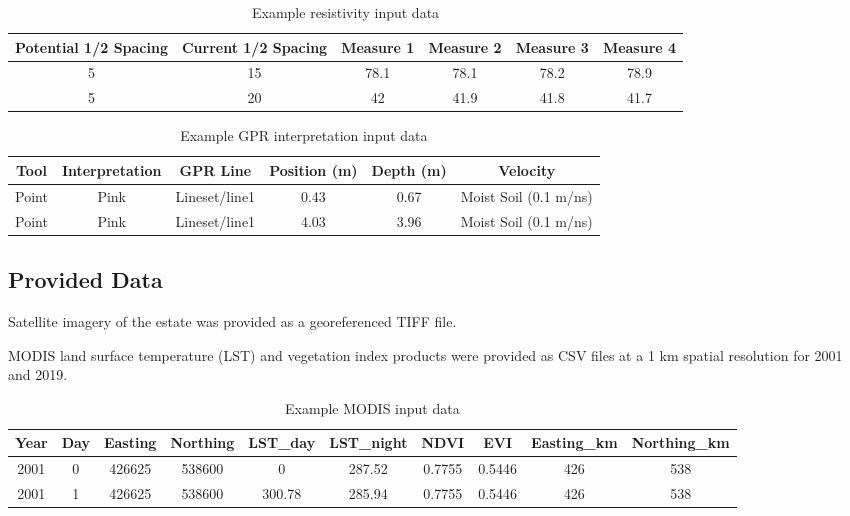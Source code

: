 \documentclass{article}
\begin{document}
\begin{table}[H]
	\centering
	\begin{tabular}{cccccc}
		\hline
		Potential 1/2 Spacing & Current 1/2 Spacing & Measure 1 & Measure 2 & Measure 3 & Measure 4 \\
		\hline
		5                     & 15                  & 78.1      & 78.1      & 78.2      & 78.9      \\
		5                     & 20                  & 42        & 41.9      & 41.8      & 41.7      \\
		\hline
	\end{tabular}
	\caption{Example resistivity input data}
\end{table}

\begin{table}[H]
	\centering
	\begin{tabular}{cccccc}
		\hline
		Tool  & Interpretation & GPR Line      & Position (m) & Depth (m) & Velocity              \\
		\hline
		Point & Pink           & Lineset/line1 & 0.43         & 0.67      & Moist Soil (0.1 m/ns) \\
		Point & Pink           & Lineset/line1 & 4.03         & 3.96      & Moist Soil (0.1 m/ns) \\
		\hline
	\end{tabular}
	\caption{Example GPR interpretation input data}
\end{table}

\subsection{Provided Data}

Satellite imagery of the estate was provided as a georeferenced TIFF file.

MODIS land surface temperature (LST) and vegetation index products were provided as CSV files at a 1 km spatial resolution for 2001 and 2019.

\begin{table}[H]
	\centering
	\begin{tabular}{cccccccccc}
		\hline
		Year & Day & Easting & Northing & LST\_day & LST\_night & NDVI   & EVI    & Easting\_km & Northing\_km \\
		\hline
		2001 & 0   & 426625  & 538600   & 0        & 287.52     & 0.7755 & 0.5446 & 426         & 538          \\
		2001 & 1   & 426625  & 538600   & 300.78   & 285.94     & 0.7755 & 0.5446 & 426         & 538          \\
		\hline
	\end{tabular}
	\caption{Example MODIS input data}
\end{table}
\end{document}
